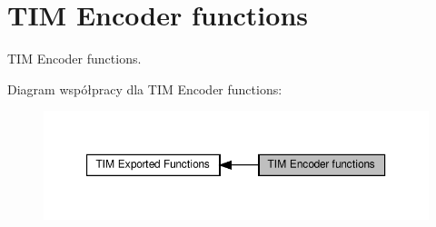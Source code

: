 \hypertarget{group___t_i_m___exported___functions___group6}{}\section{T\+IM Encoder functions}
\label{group___t_i_m___exported___functions___group6}


T\+IM Encoder functions.  


Diagram współpracy dla T\+IM Encoder functions\+:\nopagebreak
\begin{figure}[H]
\begin{center}
\leavevmode
\includegraphics[width=350pt]{group___t_i_m___exported___functions___group6}
\end{center}
\end{figure}
